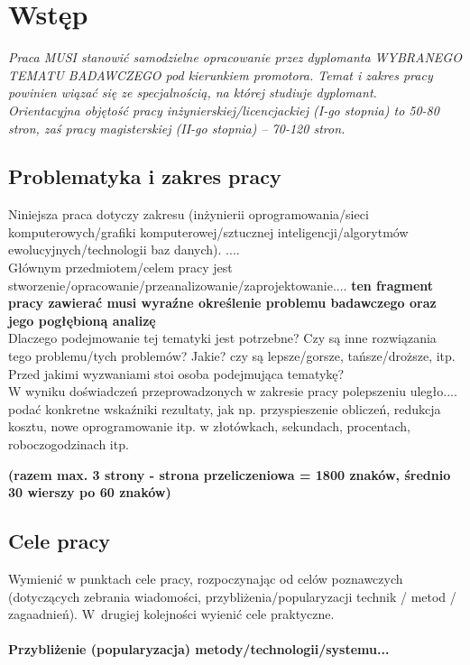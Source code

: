 \documentclass[12pt]{report}
\begin{document}
\tableofcontents	%

\chapter{Wstęp} \label{rozdz.wstep} 
{\em Praca MUSI stanowić samodzielne opracowanie przez dyplomanta WYBRANEGO TE\-MATU
BADAWCZEGO pod kierunkiem promotora. 
Temat i zakres pracy powinien wiązać się ze specjalnością, na której studiuje
dyplomant.\\
\indent Orientacyjna objętość pracy inżynierskiej/licencjackiej (I-go stopnia)
to 50-80 stron, zaś pracy magisterskiej (II-go stopnia) -- 70-120 stron.}

\section{Problematyka i zakres pracy}
Niniejsza praca dotyczy zakresu (inżynierii oprogramowania/sieci
komputero\-wych/gra\-fiki komputerowej/sztucznej inteligencji/algorytmów ewolucyjnych/technologii baz danych). ....\\
\indent Głównym przedmiotem/celem pracy jest
stworzenie/opracowanie/przeanalizo\-wanie/zaprojektowanie.... {\bf ten fragment
pracy zawierać musi wyraźne określenie problemu badawczego oraz jego pogłębioną
analizę}\\

\indent Dlaczego podejmowanie tej tematyki jest potrzebne? Czy są inne
rozwiązania tego problemu/tych problemów? Jakie? czy są lepsze/gorsze,
tańsze/droższe, itp.
\indent Przed jakimi wyzwaniami stoi osoba podejmująca tematykę? \\
 W wyniku doświadczeń przeprowadzonych w zakresie pracy polepszeniu
uległo.... podać konkretne wskaźniki rezultaty, jak np. przyspieszenie obliczeń,
redukcja kosztu, nowe oprogramowanie itp. w złotówkach, sekundach, procentach,
roboczogodzinach itp. 

{\bf (razem max. 3 strony - strona przeliczeniowa = 1800 znaków, średnio 30
wierszy po 60 znaków)}

\section{Cele pracy}
Wymienić w punktach cele pracy, rozpoczynając od celów poznawczych (dotyczą\-cych
zebrania wiadomości, przybliżenia/popularyzacji technik / metod / zagaadnień).
W~drugiej kolejności wyienić cele praktyczne.
\subsubsection{Przybliżenie (popularyzacja) metody/technologii/systemu...}
\end{document}

